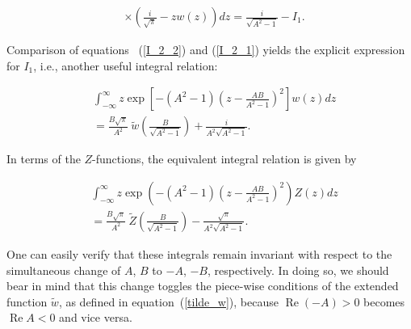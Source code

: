 \documentclass[draft]{agujournal2019}
\begin{document}
{\begin{linenomath*}
\begin{align}
&  \times\left(  \frac{i}{\sqrt{\pi}}-zw\left(  z\right)  \right)  dz=\frac
{i}{\sqrt{A^{2}-1}}-I_{1}. 
\label{I_2_1}
\end{align}
\end{linenomath*}
Comparison of equations~ (\ref{I_2_2}) and (\ref{I_2_1}) yields the explicit
expression for $I_{1}$, i.e., another useful integral relation:
\begin{linenomath*}
\begin{align}
&  \int_{-\infty}^{\infty}z\exp\left[  -(A^{2}-1)\left(  z-\frac{AB}{A^{2}%
-1}\right)  ^{2}\right]w(z)  dz\nonumber\\
&  =\frac{B\sqrt{\pi}}{A^{2}}\ \tilde{w}\left(  \frac{B}{\sqrt{A^{2}-1}}\right)
+\frac{i}{A^{2}\sqrt{A^{2}-1}}. 
\label{Int(z..)}
\end{align}
\end{linenomath*}
In terms of the $Z$-functions, the equivalent integral relation is given by
\begin{linenomath*}
\begin{align}
&  \int_{-\infty}^{\infty}z\exp\left(  -(A^{2}-1)\left(  z-\frac{AB}{A^{2}%
-1}\right)  ^{2}\right)  Z(z)dz\nonumber\\
&  =\frac{B\sqrt{\pi}}{A^{2}}\ \tilde{Z}\left(  \frac{B}{\sqrt{A^{2}-1}%
}\right)  -\frac{\sqrt{\pi}}{A^{2}\sqrt{A^{2}-1}}.
\label{Int(Z...)}
\end{align}
\end{linenomath*}
One can easily verify that these integrals remain invariant with respect to the simultaneous change of 
$A$, $B$ to $-A$, $-B$, respectively. In doing so, we should bear in mind that this change toggles the piece-wise conditions 
of the extended function $\tilde{w}$, as defined in equation~(\ref{tilde_w}), because
$\operatorname{Re}(-A)>0$ becomes $\operatorname{Re}A<0$ and vice versa.
 
}
\end{document}
